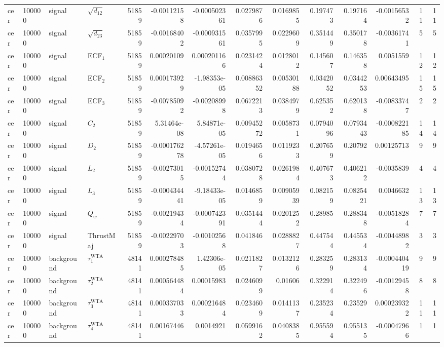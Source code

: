 \begin{landscape}
\begin{longtable}{llll r rrrr rr r rr}
cer & 100000 & signal & $\sqrt{d_{12}}$ & 51859 & -0.00112158 & -0.000502361 & 0.0279876 & 0.0169855 & 0.197473 & 0.197164 & -0.00156532 & 11 & 11 \\
cer & 100000 & signal & $\sqrt{d_{23}}$ & 51859 & -0.00168402 & -0.000931561 & 0.0357995 & 0.0229609 & 0.351449 & 0.350178 & -0.00361741 & 5 & 5 \\
cer & 100000 & signal & ECF$_1$ & 51859 & 0.00020109 & 0.000201166 & 0.0231424 & 0.0128012 & 0.145607 & 0.146358 & 0.0051559 & 12 & 12 \\
cer & 100000 & signal & ECF$_2$ & 51859 & 0.000173929 & -1.98353e-05 & 0.00886352 & 0.00530188 & 0.0342052 & 0.0344253 & 0.00643495 & 15 & 15 \\
cer & 100000 & signal & ECF$_3$ & 51859 & -0.00785092 & -0.00208998 & 0.0672213 & 0.0384979 & 0.625352 & 0.620138 & -0.00833747 & 2 & 2 \\
cer & 100000 & signal & $C_2$ & 51859 & 5.31464e-08 & 5.84871e-05 & 0.00945272 & 0.0058731 & 0.0794096 & 0.0793443 & -0.000822185 & 14 & 14 \\
cer & 100000 & signal & $D_2$ & 51859 & -0.000176278 & -4.57261e-05 & 0.0194656 & 0.0119233 & 0.207659 & 0.20792 & 0.00125713 & 9 & 9 \\
cer & 100000 & signal & $L_2$ & 51859 & -0.00273015 & -0.00152744 & 0.0380728 & 0.0261984 & 0.407673 & 0.406212 & -0.0035839 & 4 & 4 \\
cer & 100000 & signal & $L_3$ & 51859 & -0.000434441 & -9.18433e-05 & 0.0146859 & 0.00905939 & 0.082159 & 0.0825421 & 0.0046632 & 13 & 13 \\
cer & 100000 & signal & $Q_w$ & 51859 & -0.00219434 & -0.000742391 & 0.0351444 & 0.0201252 & 0.28985 & 0.288348 & -0.00518284 & 7 & 7 \\
cer & 100000 & signal & ThrustMaj & 51859 & -0.00229703 & -0.00102568 & 0.041846 & 0.0288827 & 0.447544 & 0.445534 & -0.00448982 & 3 & 3 \\
cer & 100000 & background & $\tau_1^{\mathrm{WTA}}$ & 48141 & 0.000278485 & 1.42306e-05 & 0.0211827 & 0.0132126 & 0.283259 & 0.283134 & -0.000440419 & 9 & 9 \\
cer & 100000 & background & $\tau_2^{\mathrm{WTA}}$ & 48141 & 0.000564484 & 0.00015983 & 0.0246099 & 0.01606 & 0.322914 & 0.322496 & -0.00129458 & 8 & 8 \\
cer & 100000 & background & $\tau_3^{\mathrm{WTA}}$ & 48141 & 0.000337033 & 0.000216484 & 0.0234609 & 0.0141137 & 0.235234 & 0.23529 & 0.000239322 & 11 & 11 \\
cer & 100000 & background & $\tau_4^{\mathrm{WTA}}$ & 48141 & 0.00167446 & 0.0014921 & 0.0599162 & 0.0408385 & 0.955594 & 0.955135 & -0.00047966 & 1 & 1 \\

\end{longtable}
\end{landscape}
